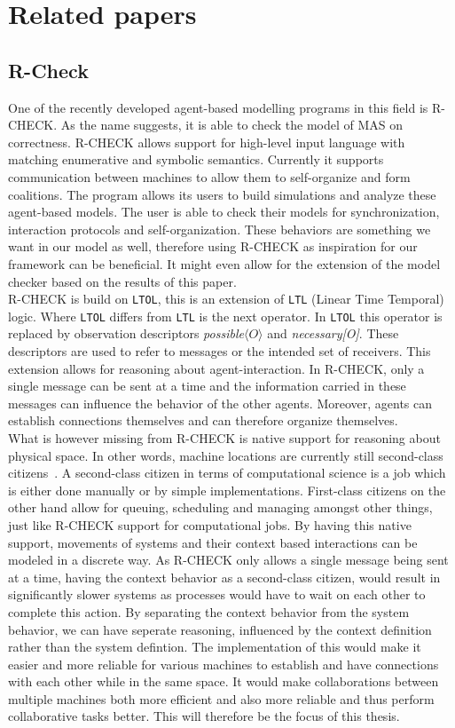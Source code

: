 \section{Related papers}
\subsection{R-Check}
One of the recently developed agent-based modelling programs in this field is R-CHECK\cite{alrahman2023language}. As the name suggests, it is able to check the model of MAS on correctness. R-CHECK allows support for high-level input language with matching enumerative and symbolic semantics. Currently it supports communication between machines to allow them to self-organize and form coalitions. The program allows its users to build simulations and analyze these agent-based models. The user is able to check their models for synchronization, interaction protocols and self-organization. These behaviors are something we want in our model as well, therefore using R-CHECK as inspiration for our framework can be beneficial. It might even allow for the extension of the model checker based on the results of this paper.
\\
R-CHECK is build on \texttt{LTOL}, this is an extension of \texttt{LTL} (Linear Time Temporal) logic. Where \texttt{LTOL} differs from \texttt{LTL} is the next operator. In \texttt{LTOL} this operator is replaced by observation descriptors \textit{possible$\langle O\rangle$} and \textit{necessary[O]}. These descriptors are used to refer to messages or the intended set of receivers. This extension allows for reasoning about agent-interaction. In R-CHECK, only a single message can be sent at a time and the information carried in these messages can influence the behavior of the other agents. Moreover, agents can establish connections themselves and can therefore organize themselves. 
\\
What is however missing from R-CHECK is native support for reasoning about physical space. In other words, machine locations are currently still second-class citizens~\cite{kosar2004stork}. A second-class citizen in terms of computational science is a job which is either done manually or by simple implementations. First-class citizens on the other hand allow for queuing, scheduling and managing amongst other things, just like R-CHECK support for computational jobs. By having this native support, movements of systems and their context based interactions can be modeled in a discrete way. As R-CHECK only allows a single message being sent at a time, having the context behavior as a second-class citizen, would result in significantly slower systems as processes would have to wait on each other to complete this action. By separating the context behavior from the system behavior, we can have seperate reasoning, influenced by the context definition rather than the system defintion. The implementation of this would make it easier and more reliable for various machines to establish and have connections with each other while in the same space. It would make collaborations between multiple machines both more efficient and also more reliable and thus perform collaborative tasks better. This will therefore be the focus of this thesis. 


